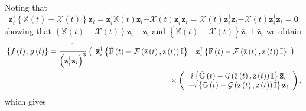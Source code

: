 \documentclass[aps,preprint]{revtex4}%
\begin{document}
Noting that
\begin{equation}
\mathbf{z}_{i}^{\dagger}\left\{  \mathbb{X}\left(  t\right)  -\mathcal{X}%
\left(  t\right)  \right\}  \mathbf{z}_{i}\mathbf{=z}_{i}^{\dagger}%
\mathbb{X}\left(  t\right)  \mathbf{z}_{i}\mathbf{-}\mathcal{X}\left(
t\right)  \mathbf{z}_{i}^{\dagger}\mathbf{z}_{i}=\mathcal{X}\left(  t\right)
\mathbf{z}_{i}^{\dagger}\mathbf{z}_{i}\mathbf{-}\mathcal{X}\left(  t\right)
\mathbf{z}_{i}^{\dagger}\mathbf{z}_{i}\mathbf{=0}%
\end{equation}
showing that $\left\{  \mathbb{X}\left(  t\right)  -\mathcal{X}\left(
t\right)  \right\}  \mathbf{z}_{i}\mathbf{\,\bot\,z}_{i}$ and $\left\{
\mathbb{\bar{X}}\left(  t\right)  -\mathcal{X}\left(  t\right)  \right\}
\mathbf{\bar{z}}_{i}\mathbf{\,\bot\,\bar{z}}_{i}$ we obtain
\begin{align}
& \left\{  f\left(  t\right)  ,g\left(  t\right)  \right\}  =\frac{1}{\left(
\mathbf{z}_{i}^{\dagger}\mathbf{z}_{i}\right)  ^{3}}\left(
\begin{array}
[c]{cc}%
\mathbf{\bar{z}}_{i}^{\dagger}\left\{  \mathbb{\bar{F}}\left(  t\right)
-\mathcal{F}\left(  \mathrm{\bar{z}}\left(  t\right)  \mathrm{,z}\left(
t\right)  \right)  \mathbb{I}\right\}   & \mathbf{z}_{i}^{\dagger}\left\{
\mathbb{F}\left(  t\right)  -\mathcal{F}\left(  \mathrm{\bar{z}}\left(
t\right)  \mathrm{,z}\left(  t\right)  \right)  \mathbb{I}\right\}
\end{array}
\right)  \nonumber\\
& \quad\qquad\qquad\qquad\qquad\qquad\qquad\qquad\qquad\qquad\qquad
\times\left(
\begin{array}
[c]{c}%
i\left\{  \mathbb{\bar{G}}\left(  t\right)  -\mathcal{G}\left(  \mathrm{\bar
{z}}\left(  t\right)  \mathrm{,z}\left(  t\right)  \right)  \mathbb{I}%
\right\}  \mathbf{\bar{z}}_{i}\\
-i\left\{  \mathbb{G}\left(  t\right)  -\mathcal{G}\left(  \mathrm{\bar{z}%
}\left(  t\right)  \mathrm{,z}\left(  t\right)  \right)  \mathbb{I}\right\}
\mathbf{z}_{i}%
\end{array}
\right)  ,
\end{align}
which gives
\end{document}
